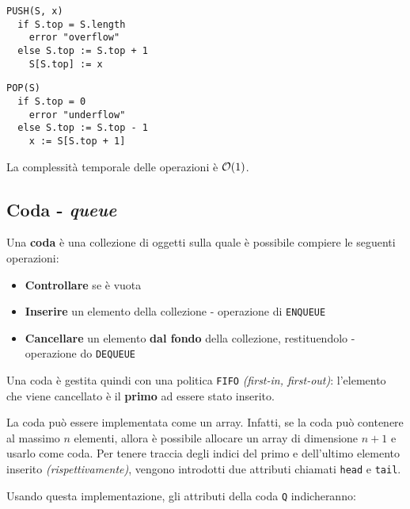 \documentclass[italian, 10pt]{article}
\begin{document}
\begin{minipage}[t]{0.495\textwidth}
  \begin{lstlisting}[style=pseudocode, caption={\texttt{PUSH} in pila}, label={lst:push-pila}]
PUSH(S, x)
  if S.top = S.length
    error "overflow"
  else S.top := S.top + 1
    S[S.top] := x
  \end{lstlisting}
\end{minipage}
\begin{minipage}[t]{0.495\textwidth}
  \begin{lstlisting}[style=pseudocode, caption={\texttt{POP} in pila}, label={lst:pop-pila}]
POP(S)
  if S.top = 0
    error "underflow"
  else S.top := S.top - 1
    x := S[S.top + 1]
  \end{lstlisting}
\end{minipage}

La complessità temporale delle operazioni è \(\mathcal{O}(1)\).

\subsection{Coda - \textit{queue}}

Una \textbf{coda} è una collezione di oggetti sulla quale è possibile compiere le seguenti operazioni:

\begin{itemize}
  \item \textbf{Controllare} se è vuota
  \item \textbf{Inserire} un elemento della collezione - operazione di \texttt{ENQUEUE}
  \item \textbf{Cancellare} un elemento \textbf{dal fondo} della collezione, restituendolo - operazione do \texttt{DEQUEUE}
\end{itemize}

Una coda è gestita quindi con una politica \texttt{FIFO} \textit{(first-in, first-out)}: l'elemento che viene cancellato è il \textbf{primo} ad essere stato inserito.

\bigskip
La coda può essere implementata come un array.
Infatti, se la coda può contenere al massimo \(n\) elementi, allora è possibile allocare un array di dimensione \(n+1\) e usarlo come coda.
Per tenere traccia degli indici del primo e dell'ultimo elemento inserito \textit{(rispettivamente)}, vengono introdotti due attributi chiamati \texttt{head} e \texttt{tail}.

Usando questa implementazione, gli attributi della coda \texttt{Q} indicheranno:
\end{document}
